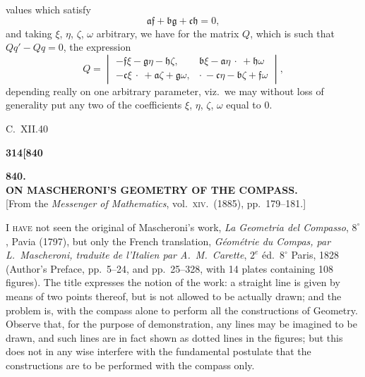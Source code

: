 \documentclass[11pt]{article}
\begin{document}
values which satisfy
\[
\mathfrak{a}\mathfrak{f} + \mathfrak{b}\mathfrak{g} + \mathfrak{c}\mathfrak{h} = 0,
\]
and taking $\xi$, $\eta$, $\zeta$, $\omega$ arbitrary, we have for the matrix $Q$, which is such that $Qq' - Qq = 0$, the expression
\[
Q = \begin{vmatrix} -\mathfrak{f}\xi - \mathfrak{g}\eta - \mathfrak{h}\zeta, & \mathfrak{b}\xi - \mathfrak{a}\eta\ \cdot\ + \mathfrak{h}\omega \\ -\mathfrak{c}\xi\ \cdot\ + \mathfrak{a}\zeta + \mathfrak{g}\omega, & \cdot\ -\mathfrak{c}\eta - \mathfrak{b}\zeta + \mathfrak{f}\omega \end{vmatrix},
\]
depending really on one arbitrary parameter, viz.\ we may without loss of generality put any two of the coefficients $\xi$, $\eta$, $\zeta$, $\omega$ equal to 0.

\bigskip

\hfill C.\ XII.\hfill\hfill 40

\bigskip
\bigskip


\newpage

\noindent\textbf{314}\hfill\hfill\textbf{[840}

\bigskip

\begin{center}
{\large\textbf{840.}}\\[0.7em]
{\large\textbf{ON MASCHERONI'S GEOMETRY OF THE COMPASS.}}\\[1em]
{\small [From the \textit{Messenger of Mathematics}, vol.\ \textsc{xiv}.\ (1885), pp.\ 179--181.]}
\end{center}

\bigskip

\noindent I \textsc{have} not seen the original of Mascheroni's work, \textit{La Geometria del Compasso}, $8^{\circ}$, Pavia (1797), but only the French translation, \textit{G\'eom\'etrie du Compas, par L.\ Mascheroni, traduite de l'Italien par A.\ M.\ Carette}, $2^{e}$ \'ed.\ $8^{\circ}$ Paris, 1828 (Author's Preface, pp.\ 5--24, and pp.\ 25--328, with 14 plates containing 108 figures). The title expresses the notion of the work: a straight line is given by means of two points thereof, but is not allowed to be actually drawn; and the problem is, with the compass alone to perform all the constructions of Geometry. Observe that, for the purpose of demonstration, any lines may be imagined to be drawn, and such lines are in fact shown as dotted lines in the figures; but this does not in any wise interfere with the fundamental postulate that the constructions are to be performed with the compass only.
\end{document}
